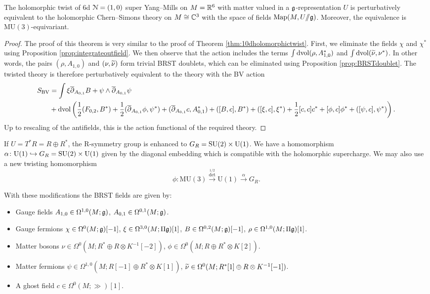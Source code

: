 \documentclass[10pt, oneside]{article}
\newcommand{\MU}{\mathrm{MU}}
\renewcommand{\U}{\mathrm{U}}
\newcommand{\ham}{/\!\!/}
\begin{document}
\begin{thm}
The holomorphic twist of 6d $\mathcal N=(1, 0)$ super Yang--Mills on $M=\mathbb R^6$ with matter valued in a $\mathfrak g$-representation $U$ is perturbatively equivalent to the holomorphic Chern--Simons theory on $M\cong \mathbb C^3$ with the space of fields $\map(M, U\ham \fg)$. Moreover, the equivalence is $\MU(3)$-equivariant.
\label{thm:6dholomorphictwist}
\end{thm}
\begin{proof}
The proof of this theorem is very similar to the proof of Theorem \ref{thm:10dholomorphictwist}. First, we eliminate the fields $\chi$ and $\chi^*$ using Proposition \ref{prop:integrateoutfield}.  We then observe that the action includes the terms $\int \operatorname{dvol}  (\rho, A_{1,0}^*)$ and $\int \operatorname{dvol} (\widetilde{\nu}, \nu^*)$.  In other words, the pairs $(\rho, A_{1,0})$ and $(\nu, \widetilde{\nu})$ form trivial BRST doublets, which can be eliminated using Proposition \ref{prop:BRSTdoublet}. The twisted theory is therefore perturbatively equivalent to the theory with the BV action 
\begin{align*}
 S_{\mathrm{BV}} &= \int \xi \overline{\partial}_{A_{0,1}} B  + \psi \wedge \overline{\partial}_{A_{0,1}} \psi \\
 &+ \operatorname{dvol}\left(\frac 12 (F_{0,2}, B^*) + \frac 12 (\overline{\partial}_{A_{0,1}} \phi, \psi^*) +  (\overline{\partial}_{A_{0, 1}} c, A_{0, 1}^*) + ([B, c], B^*) + ([\xi, c], \xi^*) + \frac{1}{2}[c, c]c^* +  [\phi, c] \phi^* + ([\psi, c],\psi^*)\right).
\end{align*}
Up to rescaling of the antifields, this is the action functional of the required theory.
\end{proof}

If $U=T^*R=R\oplus R^*$, the R-symmetry group is enhanced to $G_R=\SU(2)\times \U(1)$. We have a homomorphism $\alpha\colon \U(1)\hookrightarrow G_R=\SU(2)\times \U(1)$ given by the diagonal embedding which is compatible with the holomorphic supercharge. We may also use a new twisting homomorphism
\[\phi\colon\MU(3)\xrightarrow{\det^{1/2}}\U(1)\xrightarrow{\alpha} G_R.\]

With these modifications the BRST fields are given by:
\begin{itemize}
\item Gauge fields $A_{1, 0} \in \Omega^{1, 0}(M; \mathfrak g)$, $A_{0, 1}\in\Omega^{0, 1}(M; \mathfrak g)$.
\item Gauge fermions $\chi\in\Omega^0(M; \mathfrak g)[-1]$, $\xi\in\Omega^{3, 0}(M; \Pi\mathfrak g)[1]$, $B\in\Omega^{0, 2}(M; \mathfrak g)[-1]$, $\rho\in\Omega^{1, 0}(M; \Pi\mathfrak g)[1]$.
\item Matter bosons $\nu\in\Omega^0(M; R^*\oplus R\otimes K^{-1}[-2])$, $\phi\in\Omega^0(M; R\oplus R^*\otimes K[2])$.
\item Matter fermions $\psi\in \Omega^{1, 0}(M; R[-1]\oplus R^*\otimes K[1])$, $\widetilde{\nu}\in\Omega^0(M; R^*[1]\oplus R\otimes K^{-1}[-1])$.
\item A ghost field $c\in \Omega^0(M; \gg)[1]$.
\end{itemize}
\end{document}
